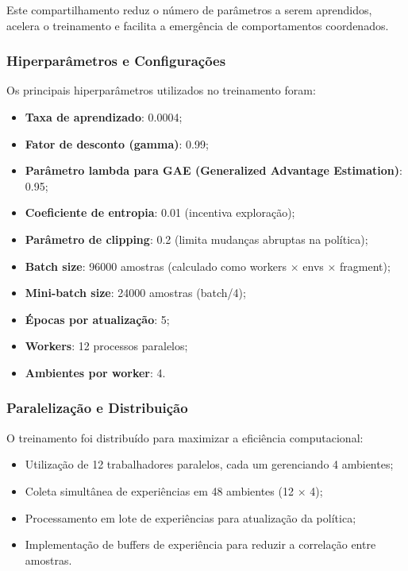 Este compartilhamento reduz o número de parâmetros a serem aprendidos, acelera o treinamento e facilita a emergência de comportamentos coordenados.

\subsubsection{Hiperparâmetros e Configurações}

Os principais hiperparâmetros utilizados no treinamento foram:

\begin{itemize}
    \item \textbf{Taxa de aprendizado}: 0.0004;
    \item \textbf{Fator de desconto (gamma)}: 0.99;
    \item \textbf{Parâmetro lambda para GAE (Generalized Advantage Estimation)}: 0.95;
    \item \textbf{Coeficiente de entropia}: 0.01 (incentiva exploração);
    \item \textbf{Parâmetro de clipping}: 0.2 (limita mudanças abruptas na política);
    \item \textbf{Batch size}: 96000 amostras (calculado como workers $\times$ envs $\times$ fragment);
    \item \textbf{Mini-batch size}: 24000 amostras (batch/4);
    \item \textbf{Épocas por atualização}: 5;
    \item \textbf{Workers}: 12 processos paralelos;
    \item \textbf{Ambientes por worker}: 4.
\end{itemize}

\subsubsection{Paralelização e Distribuição}

O treinamento foi distribuído para maximizar a eficiência computacional:

\begin{itemize}
    \item Utilização de 12 trabalhadores paralelos, cada um gerenciando 4 ambientes;
    \item Coleta simultânea de experiências em 48 ambientes (12 $\times$ 4);
    \item Processamento em lote de experiências para atualização da política;
    \item Implementação de buffers de experiência para reduzir a correlação entre amostras.
\end{itemize}

